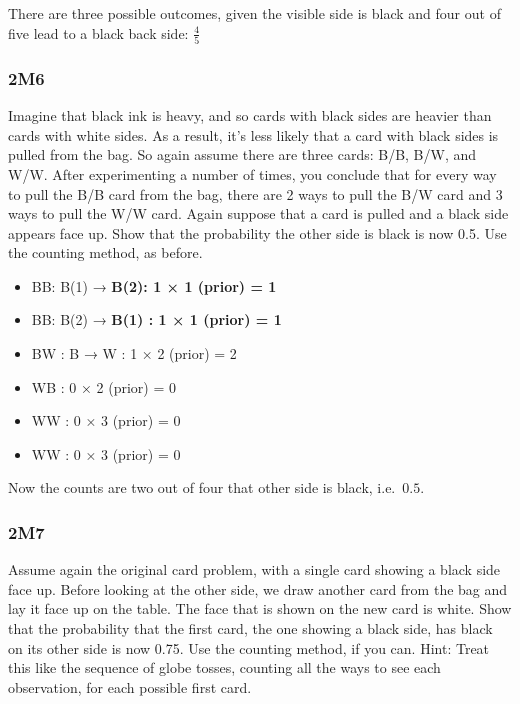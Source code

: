 \documentclass[
]{book}
\providecommand{\tightlist}{%
  \setlength{\itemsep}{0pt}\setlength{\parskip}{0pt}}
\begin{document}
There are three possible outcomes, given the visible side is black and four out of five lead to a black back side: \(\frac{4}{5}\)

\hypertarget{m6}{%
\subsubsection*{2M6}\label{m6}}

Imagine that black ink is heavy, and so cards with black sides are heavier than cards with white sides. As a result, it's less likely that a card with black sides is pulled from the bag. So again assume there are three cards: B/B, B/W, and W/W. After experimenting a number of times, you conclude that for every way to pull the B/B card from the bag, there are 2 ways to pull the B/W card and 3 ways to pull the W/W card. Again suppose that a card is pulled and a black side appears face up. Show that the probability the other side is black is now 0.5. Use the counting method, as before.

\begin{itemize}
\tightlist
\item
  B\textbar B: B(1) → \textbf{B(2): 1 × 1 (prior) = 1}
\item
  B\textbar B: B(2) → \textbf{B(1) : 1 × 1 (prior) = 1}
\item
  B\textbar W : B → W : 1 × 2 (prior) = 2
\item
  W\textbar B : 0 × 2 (prior) = 0
\item
  W\textbar W : 0 × 3 (prior) = 0
\item
  W\textbar W : 0 × 3 (prior) = 0
\end{itemize}

Now the counts are two out of four that other side is black, i.e.~\(0.5\).

\hypertarget{m7}{%
\subsubsection*{2M7}\label{m7}}

Assume again the original card problem, with a single card showing a black side face up. Before looking at the other side, we draw another card from the bag and lay it face up on the table. The face that is shown on the new card is white. Show that the probability that the first card, the one showing a black side, has black on its other side is now 0.75. Use the counting method, if you can. Hint: Treat this like the sequence of globe tosses, counting all the ways to see each observation, for each possible first card.
\end{document}
